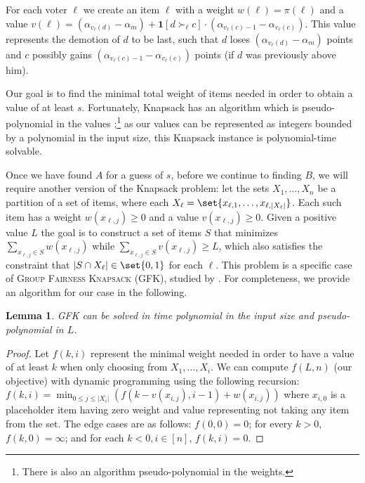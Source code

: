 \documentclass[letterpaper]{article} %
\newtheorem{lemma}{Lemma}
\newcommand{\indic}{\mathbf{1}}
\newcommand{\CIK}{\textsc{GFK}}
\newcommand{\abs}[1]{\lvert{#1}\rvert}
\begin{document}
For each voter $\ell$ we create an  item $\ell$ with a  weight $w(\ell) = \pi(\ell)$ and a value $v(\ell) = (\alpha_{v_\ell(d)} - \alpha_m) + \indic{[d \succ_\ell c]} \cdot (\alpha_{v_\ell(c) - 1} - \alpha_{v_\ell(c)})$. This value represents the demotion of  $d$ to be last, such that $d$ loses $(\alpha_{v_\ell(d)} - \alpha_m)$ points and $c$ possibly gains $ (\alpha_{v_\ell(c) - 1} - \alpha_{v_\ell(c)})$ points (if $d$ was previously above him).

Our goal is to find the minimal total weight of items needed in order to obtain a value of at least $s$. Fortunately, Knapsack has an algorithm which is pseudo-polynomial in the values \cite{cormen2009introduction};\footnote{There is also an algorithm  pseudo-polynomial in the weights.} as our values can be represented as integers bounded by a polynomial in the input size, this Knapsack instance is polynomial-time solvable.

Once we have found $A$ for a guess of $s$, before we continue to finding $B$, we will require another  version of the Knapsack problem: let the sets $X_1,\ldots,X_n$ be a partition of a set of items, where each $X_\ell = \set{x_{\ell,1},\ldots,x_{\ell,\abs{X_\ell}}} $. Each such item has a weight $w(x_{\ell,j}) \geq 0$ and a value $v(x_{\ell, j}) \geq 0$.
Given a positive value $L$ the goal is to construct a set of items $S$ that minimizes $\sum_{x_{\ell,j} \in S}{w(x_{\ell,j})}$ while $\sum_{x_{\ell,j} \in S}{v(x_{\ell,j})} \geq L$, which also satisfies  the constraint that $\abs{S \cap X_\ell}\in\set{0,1}$ for each $\ell$.
This problem is a specific case of \textsc{Group Fairness Knapsack} (\CIK{}), studied by \citet{DBLP:journals/corr/abs-2006-07832}. For completeness, we provide an algorithm for our case in the following.
\begin{lemma}
\CIK{} can be solved in time polynomial in the input size and  pseudo-polynomial in $L$.
\end{lemma}
\begin{proof}
Let $f(k, i)$ represent the minimal weight needed in order to have a value of at least $k$ when only choosing from $X_1,\ldots,X_i$.
We can compute $f(L, n)$ (our objective) with dynamic programming using the following recursion:
$f(k, i) = \min_{0 \leq j \leq \abs{X_i}}(f(k - v(x_{i, j}), i - 1) + w(x_{i, j}))$ where $x_{i, 0}$ is a placeholder item  having zero weight and value representing not taking any item from the set. The edge cases are as follows:
$f(0, 0) = 0$; for every $k > 0 $,  $f(k, 0) = \infty$; and for each $k < 0, i \in [n]$, $ f(k, i) = 0$.
\end{proof}
\end{document}
